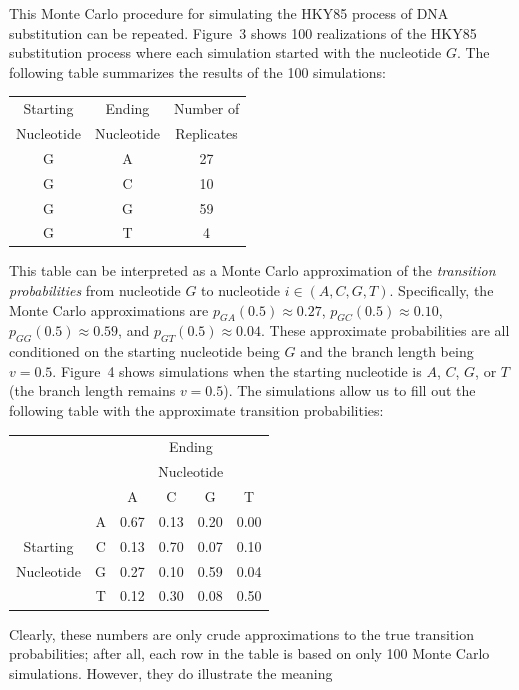 \documentclass{svmult}
\begin{document}
This Monte Carlo procedure for simulating the HKY85 process of DNA substitution can be repeated. Figure~3 shows
100 realizations of the HKY85 substitution process where each simulation started with the nucleotide $G$. 
The following table summarizes the results of the
100 simulations:
\begin{center}
\begin{tabular}{ccc}
Starting & Ending & Number of \\
Nucleotide & Nucleotide &  Replicates \\ \hline
G & A & 27 \\
G & C & 10 \\
G & G & 59 \\
G & T & 4 \\
\end{tabular}
\end{center}
This table can be interpreted as a Monte Carlo approximation of the {\it transition probabilities} from nucleotide
$G$ to nucleotide $i \in (A,C,G,T)$. Specifically, the Monte Carlo approximations are 
$p_{GA}(0.5) \approx 0.27$, 
$p_{GC}(0.5) \approx 0.10$, 
$p_{GG}(0.5) \approx 0.59$, and
$p_{GT}(0.5) \approx 0.04$.
These approximate probabilities are all conditioned on the starting nucleotide being $G$ and the branch length
being $v = 0.5$. Figure~4 shows simulations
when the starting nucleotide is $A$, $C$, $G$, or $T$ (the branch length remains $v=0.5$). The simulations allow us to fill out the following table with the approximate
transition probabilities:
\begin{center}
\begin{tabular}{crcccc}
&    & \multicolumn{4}{c}{Ending} \\
&    & \multicolumn{4}{c}{Nucleotide} \\
                     &    & A  & C & G & T \\ \cline{2-6}
                     & A \vline & 0.67 & 0.13 & 0.20 & 0.00 \\
Starting       & C \vline & 0.13 & 0.70 & 0.07 & 0.10 \\
Nucleotide & G \vline & 0.27 & 0.10 & 0.59 & 0.04 \\
                     & T \vline & 0.12 & 0.30 & 0.08 & 0.50 \\ \cline{2-6}
\end{tabular}
\end{center}
Clearly, these numbers are only crude approximations to the true transition probabilities; after all, each row in the table is based on only 100 
Monte Carlo simulations. However, they do illustrate the meaning
\end{document}
